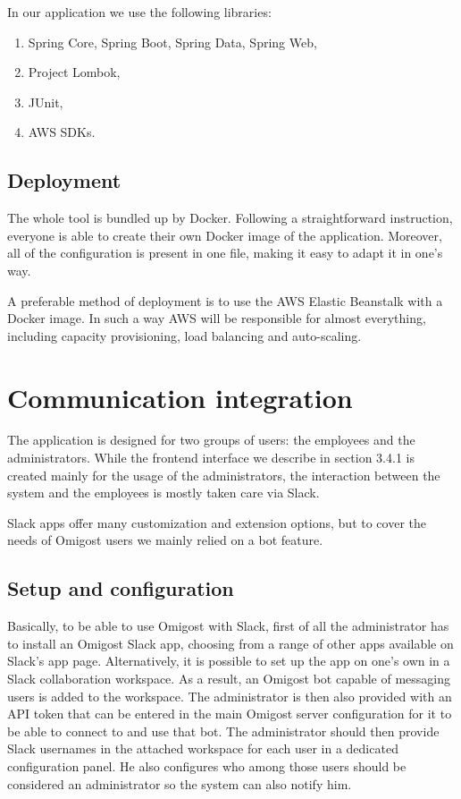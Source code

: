 \documentclass[licencjacka,en]{thesisclass}
\begin{document}
    In our application we use the following libraries:
    \begin{enumerate}
        \item Spring Core, Spring Boot, Spring Data, Spring Web,
        \item Project Lombok,
        \item JUnit,
        \item AWS SDKs.
    \end{enumerate}

    \subsection{Deployment}

    The whole tool is bundled up by Docker.
    Following a straightforward instruction, everyone is able
    to create their own Docker image of the application.
    Moreover, all of the configuration is present in one file,
    making it easy to adapt it in one's way.

    A preferable method of deployment is to use the AWS Elastic Beanstalk with a Docker image.
    In such a way AWS will be responsible for almost everything,
    including capacity provisioning, load balancing and auto-scaling.


    \section{Communication integration}
    The application is designed for two groups of users: the employees and the administrators.
    While the frontend interface we describe in section 3.4.1 is created mainly for the usage
    of the administrators, the interaction between the system and the employees is mostly
    taken care via Slack.

    Slack apps offer many customization and extension options, but to cover
    the needs of Omigost users we mainly relied on a bot feature.

    \subsection{Setup and configuration}

    Basically, to be able to use Omigost with Slack, first of all the administrator
    has to install an Omigost Slack app, choosing from a range of other apps
    available on Slack's app page.
    Alternatively, it is possible to set up the app on one's own
    in a Slack collaboration workspace.
    As a result, an Omigost bot capable of messaging users is added to the workspace.
    The administrator is then also provided with an API token that can be entered in
    the main Omigost server configuration for it to be able
    to connect to and use that bot.
    The administrator should then provide Slack usernames in the attached
    workspace for each user in a dedicated configuration panel.
    He also configures who among those users should be considered an administrator
    so the system can also notify him.
\end{document}
